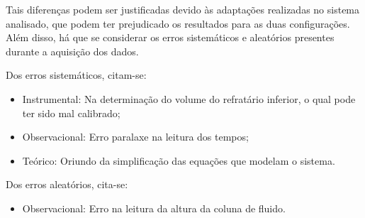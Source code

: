 Tais diferenças podem ser justificadas devido às adaptações realizadas no
sistema analisado, que podem ter prejudicado os resultados para as duas
configurações. Além disso, há que se considerar os erros sistemáticos e
aleatórios presentes durante a aquisição dos dados.

Dos erros sistemáticos, citam-se:
\begin{itemize}
\item Instrumental: Na determinação do volume do refratário inferior, o qual
  pode ter sido mal calibrado;
\item Observacional: Erro paralaxe na leitura dos tempos;
\item Teórico: Oriundo da simplificação das equações que modelam o sistema.
\end{itemize}

Dos erros aleatórios, cita-se:
\begin{itemize}
\item Observacional: Erro na leitura da altura da coluna de fluido.
\end{itemize}

